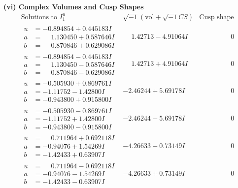 \documentclass[1p]{elsarticle_modified}
\theoremstyle{definition}
\newcommand{\I}{\sqrt{-1}}
\begin{document}
\newpage\flushleft \textbf{(vi) Complex Volumes and Cusp Shapes}
$$\begin{array}{c|c|c}  
\text{Solutions to }I^u_{1}& \I (\text{vol} + \sqrt{-1}CS) & \text{Cusp shape}\\
 \hline 
\begin{aligned}
u &= -0.894854 + 0.445183 I \\
a &= \phantom{-}1.130450 + 0.587646 I \\
b &= \phantom{-}0.870846 + 0.629086 I\end{aligned}
 & \phantom{-}1.42713 - 4.91064 I & \phantom{-0.000000 } 0 \\ \hline\begin{aligned}
u &= -0.894854 - 0.445183 I \\
a &= \phantom{-}1.130450 - 0.587646 I \\
b &= \phantom{-}0.870846 - 0.629086 I\end{aligned}
 & \phantom{-}1.42713 + 4.91064 I & \phantom{-0.000000 } 0 \\ \hline\begin{aligned}
u &= -0.505930 + 0.869761 I \\
a &= -1.11752 - 1.42800 I \\
b &= -0.943800 + 0.915800 I\end{aligned}
 & -2.46244 + 5.69178 I & \phantom{-0.000000 } 0 \\ \hline\begin{aligned}
u &= -0.505930 - 0.869761 I \\
a &= -1.11752 + 1.42800 I \\
b &= -0.943800 - 0.915800 I\end{aligned}
 & -2.46244 - 5.69178 I & \phantom{-0.000000 } 0 \\ \hline\begin{aligned}
u &= \phantom{-}0.711964 + 0.692118 I \\
a &= -0.94076 + 1.54269 I \\
b &= -1.42433 + 0.63907 I\end{aligned}
 & -4.26633 - 0.73149 I & \phantom{-0.000000 } 0 \\ \hline\begin{aligned}
u &= \phantom{-}0.711964 - 0.692118 I \\
a &= -0.94076 - 1.54269 I \\
b &= -1.42433 - 0.63907 I\end{aligned}
 & -4.26633 + 0.73149 I & \phantom{-0.000000 } 0 \\ \hline\begin{aligned}

\end{aligned}
\end{array}$$
\end{document}
